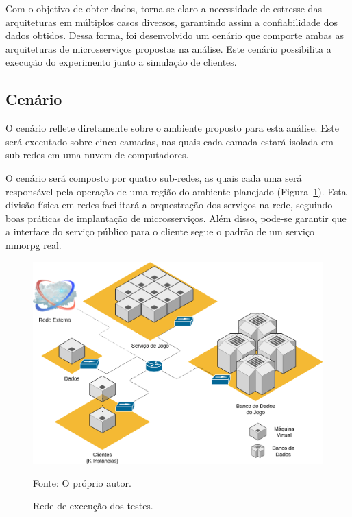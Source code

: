 Com o objetivo de obter dados, torna-se claro a necessidade de estresse das arquiteturas em múltiplos casos diversos, garantindo assim a confiabilidade dos dados obtidos.
%
Dessa forma, foi desenvolvido um cenário que comporte ambas as arquiteturas de microsserviços propostas na análise.
%
Este cenário possibilita a execução do experimento junto a simulação de clientes.



\subsection{Cenário}



O cenário reflete diretamente sobre o ambiente proposto para esta análise.
%
Este será executado sobre cinco camadas, nas quais cada camada estará isolada em sub-redes em uma nuvem de computadores.

O cenário será composto por quatro sub-redes, as quais cada uma será responsável pela operação de uma região do ambiente planejado (Figura~\ref{fig:cenario}).
%
Esta divisão física em redes facilitará a orquestração dos serviços na rede, seguindo boas práticas de implantação de microsserviços.
%
Além disso, pode-se garantir que a interface do serviço público para o cliente segue o padrão de um serviço \ac{mmorpg} real.

\begin{figure}[htb!]
  \caption{Rede de execução dos testes.}
  \label{fig:cenario}
  \includegraphics[width=\textwidth]{img/cap3/cenario.png}
  \centering

  Fonte: O próprio autor.
\end{figure}

